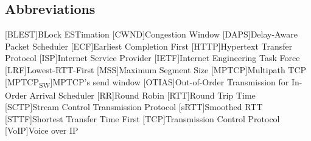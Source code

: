 \newcommand{\abbr}{Abbreviations}
\subsection{Abbreviations}

\begin{acronym}[1234567890]		%
\setlength{\itemsep}{-\parsep}	%

[BLEST]{BLock ESTimation}
[CWND]{Congestion Window}
[DAPS]{Delay-Aware Packet Scheduler}
[ECF]{Earliest Completion First}
[HTTP]{Hypertext Transfer Protocol}
[ISP]{Internet Service Provider}
[IETF]{Internet Engineering Task Force}
[LRF]{Lowest-RTT-First}
[MSS]{Maximum Segment Size}
[MPTCP]{Multipath TCP}
[MPTCP\textsubscript{SW}]{MPTCP's send window}
[OTIAS]{Out-of-Order Transmission for In-Order Arrival Scheduler}
[RR]{Round Robin}
[RTT]{Round Trip Time}
[SCTP]{Stream Control Transmission Protocol}
[sRTT]{Smoothed RTT}
[STTF]{Shortest Transfer Time First}
[TCP]{Transmission Control Protocol}
[VoIP]{Voice over IP}
\end{acronym}